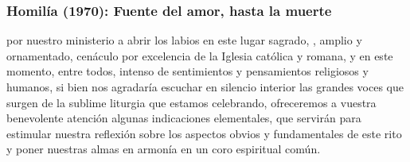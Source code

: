 \newpage

\subsubsection{Homilía (1970): Fuente del amor, hasta la muerte}


\begin{body}
 por nuestro ministerio a abrir los labios en este lugar sagrado, , amplio y ornamentado, cenáculo por excelencia de la Iglesia católica y romana, y en este momento, entre todos, intenso de sentimientos y pensamientos religiosos y humanos, si bien nos agradaría escuchar en silencio interior las grandes voces que surgen de la sublime liturgia que estamos celebrando, ofreceremos a vuestra benevolente atención algunas indicaciones elementales, que servirán para estimular nuestra reflexión sobre los aspectos obvios y fundamentales de este rito y poner nuestras almas en armonía en un coro espiritual común. 
\end{body}


